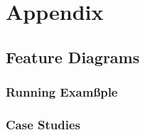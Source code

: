 \appendix
\chapter{Appendix}
\label{appendix}

\section{Feature Diagrams}
\label{feature_diagrams}

\subsection{Running Examßple}



\subsection{Case Studies}

